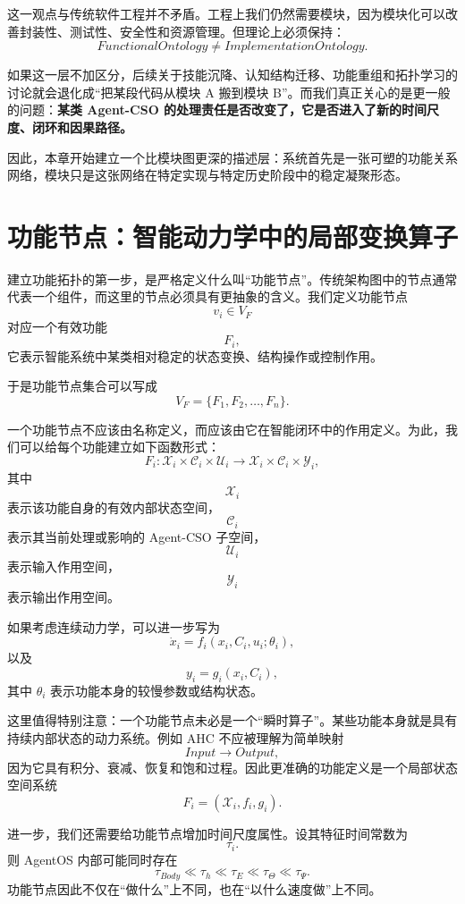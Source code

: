这一观点与传统软件工程并不矛盾。工程上我们仍然需要模块，因为模块化可以改善封装性、测试性、安全性和资源管理。但理论上必须保持：
\[
\boxed{
FunctionalOntology
\neq
ImplementationOntology.
}
\]

如果这一层不加区分，后续关于技能沉降、认知结构迁移、功能重组和拓扑学习的讨论就会退化成“把某段代码从模块 A 搬到模块 B”。而我们真正关心的是更一般的问题：\textbf{某类 Agent-CSO 的处理责任是否改变了，它是否进入了新的时间尺度、闭环和因果路径。}

因此，本章开始建立一个比模块图更深的描述层：系统首先是一张可塑的功能关系网络，模块只是这张网络在特定实现与特定历史阶段中的稳定凝聚形态。


\section{功能节点：智能动力学中的局部变换算子}

建立功能拓扑的第一步，是严格定义什么叫“功能节点”。传统架构图中的节点通常代表一个组件，而这里的节点必须具有更抽象的含义。我们定义功能节点
\[
v_i\in V_F
\]
对应一个有效功能
\[
F_i,
\]
它表示智能系统中某类相对稳定的状态变换、结构操作或控制作用。

于是功能节点集合可以写成
\[
V_F
=
\{F_1,F_2,\ldots,F_n\}.
\]

一个功能节点不应该由名称定义，而应该由它在智能闭环中的作用定义。为此，我们可以给每个功能建立如下函数形式：
\[
F_i:
\mathcal X_i
\times
\mathcal C_i
\times
\mathcal U_i
\rightarrow
\mathcal X_i
\times
\mathcal C_i
\times
\mathcal Y_i,
\]
其中
\[
\mathcal X_i
\]
表示该功能自身的有效内部状态空间，
\[
\mathcal C_i
\]
表示其当前处理或影响的 Agent-CSO 子空间，
\[
\mathcal U_i
\]
表示输入作用空间，
\[
\mathcal Y_i
\]
表示输出作用空间。

如果考虑连续动力学，可以进一步写为
\[
\dot{x}_i
=
f_i
\left(
x_i,
C_i,
u_i;
\theta_i
\right),
\]
以及
\[
y_i
=
g_i
\left(
x_i,
C_i
\right),
\]
其中 $\theta_i$ 表示功能本身的较慢参数或结构状态。

这里值得特别注意：一个功能节点未必是一个“瞬时算子”。某些功能本身就是具有持续内部状态的动力系统。例如 AHC 不应被理解为简单映射
\[
Input\rightarrow Output,
\]
因为它具有积分、衰减、恢复和饱和过程。因此更准确的功能定义是一个局部状态空间系统
\[
F_i
=
(\mathcal X_i,f_i,g_i).
\]

进一步，我们还需要给功能节点增加时间尺度属性。设其特征时间常数为
\[
\tau_i.
\]
则 AgentOS 内部可能同时存在
\[
\tau_{Body}
\ll
\tau_h
\ll
\tau_E
\ll
\tau_\Theta
\ll
\tau_\Psi.
\]
功能节点因此不仅在“做什么”上不同，也在“以什么速度做”上不同。

